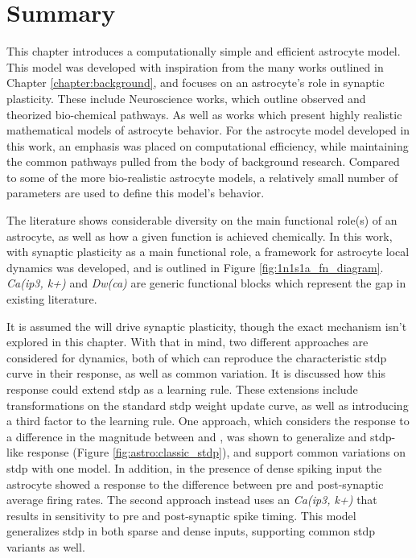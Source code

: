 
\section{Summary}

This chapter introduces a computationally simple and efficient astrocyte
model. This model was developed with inspiration from the many works outlined in
Chapter \ref{chapter:background}, and focuses on an astrocyte's role in synaptic
plasticity. These include Neuroscience works, which outline observed and
theorized bio-chemical pathways. As well as works which present highly realistic
mathematical models of astrocyte behavior. For the astrocyte model developed in
this work, an emphasis was placed on computational efficiency, while maintaining
the common pathways pulled from the body of background research. Compared to
some of the more bio-realistic astrocyte models, a relatively small number of
parameters are used to define this model's behavior.

The literature shows considerable diversity on the main functional role(s) of an
astrocyte, as well as how a given function is achieved chemically. In this work,
with synaptic plasticity as a main functional role, a framework for astrocyte
local dynamics was developed, and is outlined in Figure
\ref{fig:1n1s1a_fn_diagram}. \emph{Ca(ip3, k+)} and \emph{Dw(ca)} are generic
functional blocks which represent the gap in existing literature.

It is assumed the \ca will drive synaptic plasticity, though the exact mechanism
isn't explored in this chapter. With that in mind, two different approaches are
considered for \ca dynamics, both of which can reproduce the characteristic
\gls{stdp} curve in their \ca response, as well as common variation. It is discussed
how this \ca response could extend \gls{stdp} as a learning rule. These
extensions include transformations on the standard \gls{stdp} weight update curve, as
well as introducing a third factor to the learning rule. One approach, which
considers the \ca response to a difference in the magnitude between \ipt and
\kp, was shown to generalize and \gls{stdp}-like response (Figure
\ref{fig:astro:classic_stdp}), and support common variations on
\gls{stdp} with one model. In addition, in the presence of dense spiking input the
astrocyte showed a response to the difference between pre and post-synaptic
average firing rates. The second approach instead uses an \emph{Ca(ip3, k+)} that
results in sensitivity to pre and post-synaptic spike timing. This model
generalizes \gls{stdp} in both sparse and dense inputs, supporting common \gls{stdp}
variants as well.

